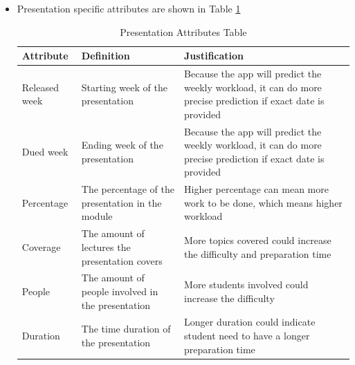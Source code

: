 \documentclass[fyp]{socreport}
\begin{document}
\begin{itemize}
	\item Presentation specific attributes are shown in Table {\ref{presentation-attribute}}
	\begin{table}[]
	\centering
	\begin{tabular}{|p{}|p{}|p{}|}
	\hline
		\rowcolor[HTML]{C0C0C0}
	  \textbf{Attribute} & \textbf{Definition} & \textbf{Justification} \\
	\hline
	Released week & Starting week of the presentation & Because the app will predict the weekly workload, it can do more precise prediction if exact date is provided \\
	\hline
	Dued week & Ending week of the presentation & Because the app will predict the weekly workload, it can do more precise prediction if exact date is provided \\
	\hline
	Percentage & The percentage of the presentation in the module & Higher percentage can mean more work to be done, which means higher workload \\
	\hline
	Coverage & The amount of lectures the presentation covers & More topics covered could increase the difficulty and preparation time \\
	\hline
	People & The amount of people involved in the presentation & More students involved could increase the difficulty \\
	\hline
	Duration & The time duration of the presentation & Longer duration could indicate student need to have a longer preparation time \\
	\hline
	\end{tabular}
	\caption{Presentation Attributes Table}
	\label{presentation-attribute}
	\end{table}


\end{itemize}
\end{document}
